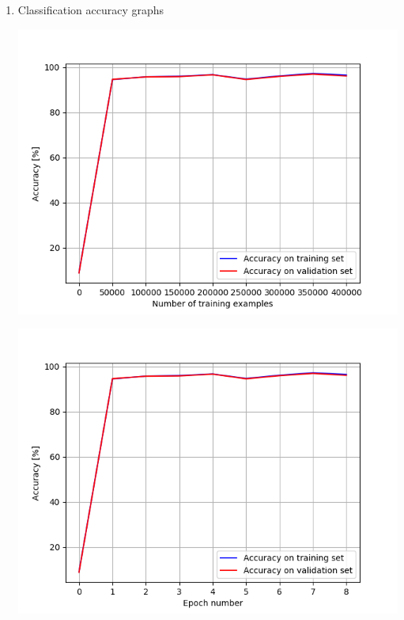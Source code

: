 \documentclass[a4paper]{iacas}
\begin{document}
\begin{enumerate}
\item Classification accuracy graphs

\vskip 0.1in
\begin{minipage}{\linewidth}
	\includegraphics[scale=0.8]{hw2_py/results/_14_11_31/lr_0_01_net_2_CE_/accuracy.png}
	\label{fig_21}
\end{minipage}
\vskip 0.1in
\begin{minipage}{\linewidth}
	\includegraphics[scale=0.8]{hw2_py/results/_14_11_31/lr_0_01_net_2_CE_/accuracy_epoch.png}
	\label{fig_22}
\end{minipage}
\vskip 0.1in

\end{enumerate}
\end{document}
